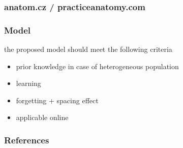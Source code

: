 \documentclass[xcolor=svgnames]{beamer}
\begin{document}
\begin{frame}
	\frametitle{anatom.cz / practiceanatomy.com}
\end{frame}
\begin{frame}
	\frametitle{Model}
	the proposed model should meet the following criteria
	\begin{itemize}
		\item prior knowledge in case of heterogeneous population
		\item learning
		\item forgetting + spacing effect
		\item applicable online
	\end{itemize}
\end{frame}
\begin{frame}[t,allowframebreaks]
	\frametitle{References}
	\printbibliography[notcategory=fullcited]
\end{frame}
\end{document}
